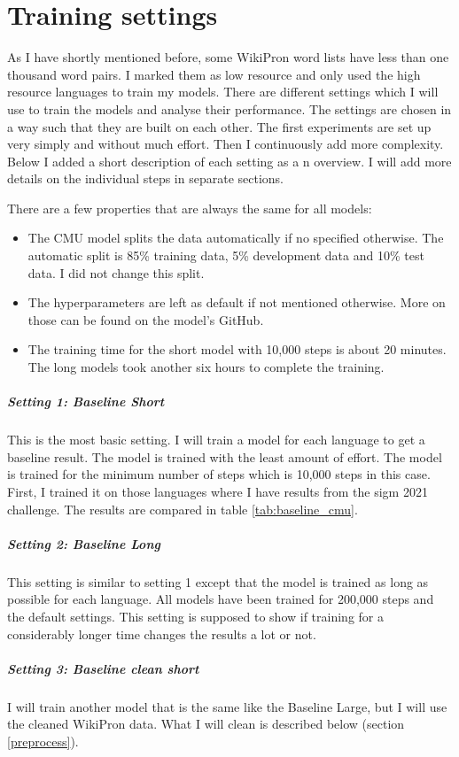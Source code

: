 \section{Training settings}
As I have shortly mentioned before, some WikiPron word lists have less than one thousand word pairs. I marked them as low resource and only used the high resource languages to train my models. There are different settings which I will use to train the models and analyse their performance. The settings are chosen in a way such that they are built on each other. The first experiments are set up very simply and without much effort. Then I continuously add more complexity. Below I added a short description of each setting as a n overview. I will add more details on the individual steps in separate sections. 

There are a few properties that are always the same for all models:
\begin{itemize}
\item The CMU model splits the data automatically if no specified otherwise. The automatic split is 85\% training data, 5\% development data and 10\% test data. I did not change this split.
\item The hyperparameters are left as default if not mentioned otherwise. More on those can be found on the model's GitHub.
\item The training time for the short model with 10,000 steps is about 20 minutes. The long models took another six hours to complete the training.  
\end{itemize}

\subparagraph{Setting 1: Baseline Short}
This is the most basic setting. I will train a model for each language to get a baseline result. The model is trained with the least amount of effort. The model is trained for the minimum number of steps which is 10,000 steps in this case. First, I trained it on those languages where I have results from the \ac{sigm} 2021 challenge. The results are compared in table \ref{tab:baseline_cmu}.

\subparagraph{Setting 2: Baseline Long}
This setting is similar to setting 1 except that the model is trained as long as possible for each language. All models have been trained for 200,000 steps and the default settings. This setting is supposed to show if training for a considerably longer time changes the results a lot or not.

\subparagraph{Setting 3: Baseline clean short}
I will train another model that is the same like the Baseline Large, but I will use the cleaned WikiPron data. What I will clean is described below (section \ref{preprocess}).

